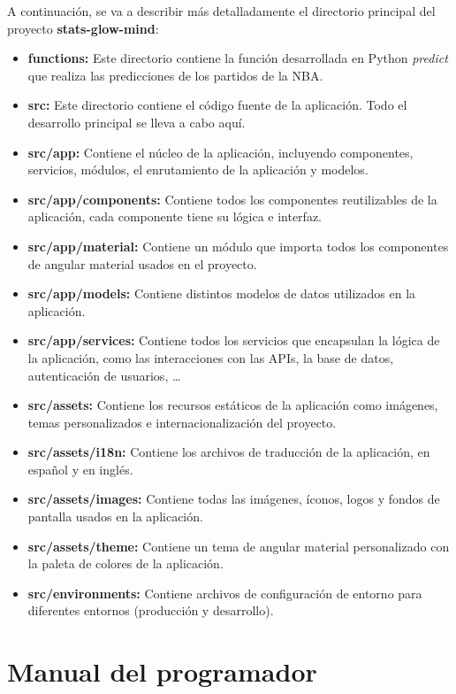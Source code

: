 A continuación, se va a describir más detalladamente el directorio principal del proyecto \textbf{stats-glow-mind}:
\begin{itemize}
\tightlist
    \item
        \textbf{functions:} Este directorio contiene la función desarrollada en Python \textit{predict} que realiza las predicciones de los partidos de la NBA.
    \item 
        \textbf{src:} Este directorio contiene el código fuente de la aplicación. Todo el desarrollo principal se lleva a cabo aquí.
    \item
        \textbf{src/app:} Contiene el núcleo de la aplicación, incluyendo componentes, servicios, módulos, el enrutamiento de la aplicación y modelos.
    \item
        \textbf{src/app/components:} Contiene todos los componentes reutilizables de la aplicación, cada componente tiene su lógica e interfaz.
    \item
        \textbf{src/app/material:} Contiene un módulo que importa todos los componentes de angular material usados en el proyecto.
    \item
        \textbf{src/app/models:} Contiene distintos modelos de datos utilizados en la aplicación.
    \item
        \textbf{src/app/services:} Contiene todos los servicios que encapsulan la lógica de la aplicación, como las interacciones con las APIs, la base de datos, autenticación de usuarios, \ldots
    \item
        \textbf{src/assets:} Contiene los recursos estáticos de la aplicación como imágenes, temas personalizados e internacionalización del proyecto.
    \item
        \textbf{src/assets/i18n:} Contiene los archivos de traducción de la aplicación, en español y en inglés.
    \item
        \textbf{src/assets/images:} Contiene todas las imágenes, íconos, logos y fondos de pantalla usados en la aplicación.
    \item
        \textbf{src/assets/theme:} Contiene un tema de angular material personalizado con la paleta de colores de la aplicación.
    \item
        \textbf{src/environments:} Contiene archivos de configuración de entorno para diferentes entornos (producción y desarrollo).
\end{itemize}

\hfill

\section{Manual del programador}

